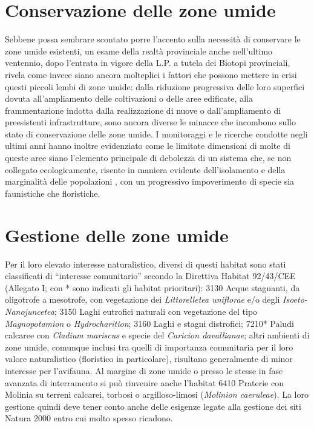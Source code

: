 \documentclass[10pt,twoside,openany,x11names,svgnames,italian,a5paper,dvipsnames,table]{memoir}
\begin{document}
\section{Conservazione delle zone umide}
Sebbene possa sembrare scontato porre l'accento sulla necessità di conservare le zone umide esistenti, un esame della realtà provinciale anche nell'ultimo ventennio, dopo l’entrata in vigore della L.P. a tutela dei Biotopi provinciali, rivela come invece siano ancora molteplici i fattori che possono mettere in crisi questi piccoli lembi di zone umide: dalla riduzione progressiva delle loro superfici dovuta all'ampliamento delle coltivazioni o delle aree edificate, alla frammentazione indotta dalla realizzazione di nuove o dall'ampliamento di preesistenti infrastrutture, sono ancora diverse le minacce che incombono sullo stato di conservazione delle zone umide. I monitoraggi e le ricerche condotte negli ultimi anni hanno inoltre evidenziato come le limitate dimensioni di molte di queste aree siano l’elemento principale di debolezza di un sistema che, se non collegato ecologicamente, risente in maniera evidente dell'isolamento e della marginalità delle popolazioni \cite{Brambilla12}, con un progressivo impoverimento di specie sia faunistiche che floristiche.

\section{Gestione delle zone umide}
Per il loro elevato interesse naturalistico, diversi di questi habitat sono stati classificati di “interesse comunitario” secondo la Direttiva Habitat 92/43/CEE (Allegato I; con * sono indicati gli habitat prioritari): 3130 Acque stagnanti, da oligotrofe a mesotrofe, con vegetazione dei \emph{Littorelletea uniflorae} e/o degli \emph{Isoeto-Nanojuncetea}; 3150 Laghi eutrofici naturali con vegetazione del tipo \emph{Magnopotamion} o \emph{Hydrocharition}; 3160 Laghi e stagni distrofici; 7210* Paludi calcaree con \emph{Cladium mariscus} e specie del \emph{Caricion davallianae}; altri ambienti di zone umide, comunque inclusi tra quelli di importanza comunitaria per il loro valore naturalistico (floristico in particolare), risultano generalmente di minor interesse per l'avifauna. Al margine di zone umide o presso le stesse in fase avanzata di interramento si può rinvenire anche l'habitat 6410 Praterie con Molinia su terreni calcarei, torbosi o argilloso-limosi (\emph{Molinion caeruleae}). La loro gestione quindi deve tener conto anche delle esigenze legate alla gestione dei siti Natura 2000 entro cui molto spesso ricadono.
\end{document}
